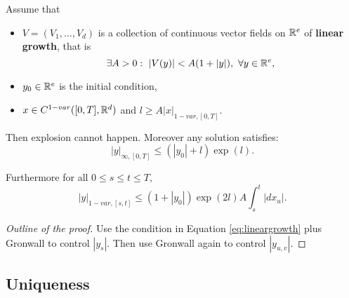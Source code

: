 \begin{theorem}[No explosion]
 Assume that
    \begin{itemize}
        \item $V = (V_1, \ldots, V_d)$ is a collection of continuous vector fields on $\mathbb{R}^e$ of \textbf{linear growth}, that is
        \begin{equation}\label{eq:lineargrowth}
             \exists A > 0:\ |V(y)| < A (1 + |y|),\ \forall y \in \mathbb{R}^e,
        \end{equation}
        \item $y_0 \in \mathbb{R}^e$ is the initial condition,
        \item $x \in C^{1-var}([0,T], \mathbb{R}^d)$ and $l \geq A |x|_{1-var,[0,T]}.$
    \end{itemize}   
    Then explosion cannot happen. Moreover any solution satisfies:
    \begin{equation}
        |y|_{\infty, [0,T]} \leq (|y_0| + l) \exp(l).
    \end{equation}

    Furthermore for all $0 \leq s \leq t \leq T,$ 
    \begin{equation}
        |y|_{1-var, [s,t]} \leq (1 + |y_0|) \exp(2l) A \int_s^t |dx_u|.
    \end{equation}
\end{theorem}
\begin{proof}[Outline of the proof]
    Use the condition in Equation \eqref{eq:lineargrowth} plus Gronwall to control $|y_s|.$
    Then use Gronwall again to control $|y_{u,v}|.$
\end{proof}

\subsection{Uniqueness}

